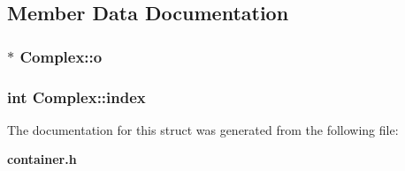 \subsection{Member Data Documentation}
\subsubsection{$\ast$ {\bf Complex::o}}\label{structComplex_8f85f8797081817b2029fd94f40d5de2}


\subsubsection{\setlength{\rightskip}{0pt plus 5cm}int {\bf Complex::index}}\label{structComplex_03af76523c5ced4e5e709f54e3869fb6}




The documentation for this struct was generated from the following file:\begin{CompactItemize}
\item 
{\bf container.h}\end{CompactItemize}
